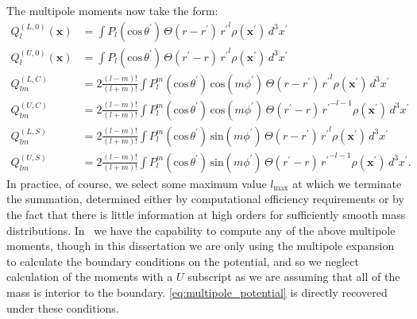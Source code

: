 \documentclass[12pt]{article}
\begin{document}
The multipole moments now take the form:
\begin{align}
  Q_l^{(L,0)}(\mathbf{x}) &= \int P_l(\text{cos}\, \theta^\prime)\, \Theta(r - r^\prime)\, {r^{\prime}}^l \rho(\mathbf{x}^\prime)\, d^3 x^\prime \\
  Q_l^{(U,0)}(\mathbf{x}) &= \int P_l(\text{cos}\, \theta^\prime)\, \Theta(r^\prime - r)\, {r^{\prime}}^l \rho(\mathbf{x}^\prime)\, d^3 x^\prime \\
  Q_{lm}^{(L,C)} &= 2\frac{(l-m)!}{(l+m)!} \int P_{l}^{m}(\text{cos}\, \theta^\prime)\, \text{cos}(m\phi^\prime)\, \Theta(r - r^\prime)\, {r^\prime}^l \rho(\mathbf{x}^\prime)\, d^3 x^\prime \\
  Q_{lm}^{(U,C)} &= 2\frac{(l-m)!}{(l+m)!} \int P_{l}^{m}(\text{cos}\, \theta^\prime)\, \text{cos}(m\phi^\prime)\, \Theta(r^\prime - r)\, {r^\prime}^{-l-1} \rho(\mathbf{x}^\prime)\, d^3 x^\prime \\
  Q_{lm}^{(L,S)} &= 2\frac{(l-m)!}{(l+m)!} \int P_{l}^{m}(\text{cos}\, \theta^\prime)\, \text{sin}(m\phi^\prime)\, \Theta(r - r^\prime)\, {r^\prime}^l \rho(\mathbf{x}^\prime)\, d^3 x^\prime \\
  Q_{lm}^{(U,S)} &= 2\frac{(l-m)!}{(l+m)!} \int P_{l}^{m}(\text{cos}\, \theta^\prime)\, \text{sin}(m\phi^\prime)\, \Theta(r^\prime - r)\, {r^\prime}^{-l-1} \rho(\mathbf{x}^\prime)\, d^3 x^\prime.
\end{align}
In practice, of course, we select some maximum value $l_{\text{max}}$ at which we terminate the summation, determined either by computational efficiency requirements or by the fact that there is little information at high orders for sufficiently smooth mass distributions. In \castro\ we have the capability to compute any of the above multipole moments, though in this dissertation we are only using the multipole expansion to calculate the boundary conditions on the potential, and so we neglect calculation of the moments with a $U$ subscript as we are assuming that all of the mass is interior to the boundary. \autoref{eq:multipole_potential} is directly recovered under these conditions.

\clearpage
\end{document}

